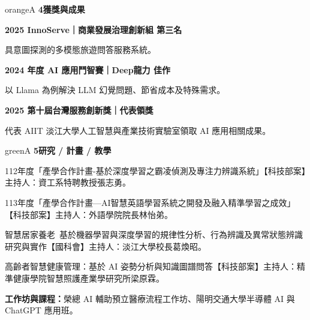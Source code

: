\documentclass[10pt,a4paper]{extarticle}
\newcommand{\hi}[1]{\textcolor{redA}{\textbf{#1}}}
\newcommand{\sect}[3]{%
  {\fontsize{13}{14}\selectfont\bfseries\textcolor{#2}{#1}\hspace{1mm}#3}\par\vspace{.45mm}
}
\begin{document}
\vspace{1mm}
\begin{minipage}[t]{96mm}
  \begin{colorboxx}[height=47mm]{orangeA}
    \sect{4}{orangeA}{獲獎與成果}
    {\small
    \textbf{2025 InnoServe｜商業發展治理創新組 \hi{第三名}}\par
    具意圖探測的多模態旅遊問答服務系統。\par\vspace{.7mm}
    \textbf{2024 年度 AI 應用鬥智賽｜Deep龍力 \hi{佳作}}\par
    以 Llama 為例解決 LLM 幻覺問題、節省成本及特殊需求。\par\vspace{.7mm}
    \textbf{2025 第十屆台灣服務創新獎｜\hi{代表領獎}}\par
    代表 AIIT 淡江大學人工智慧與產業技術實驗室領取 AI 應用相關成果。}
  \end{colorboxx}
\end{minipage}\hfill
\begin{minipage}[t]{98mm}
  \begin{colorboxx}[height=47mm]{greenA}
    \sect{5}{greenA}{研究 / 計畫 / 教學}
    {\footnotesize
    112年度「產學合作計畫-基於深度學習之霸凌偵測及專注力辨識系統」【科技部案】主持人：資工系特聘教授張志勇。\par
    113年度「產學合作計畫—AI智慧英語學習系統之開發及融入精準學習之成效」【科技部案】主持人：外語學院院長林怡弟。\par
    智慧居家養老~基於機器學習與深度學習的規律性分析、行為辨識及異常狀態辨識研究與實作【國科會】主持人：淡江大學校長葛煥昭。\par
    高齡者智慧健康管理：基於 AI 姿勢分析與知識圖譜問答【科技部案】主持人：精準健康學院智慧照護產業學研究所梁原霖。\par
    \textbf{工作坊與課程：}榮總 AI 輔助預立醫療流程工作坊、陽明交通大學半導體 AI 與 ChatGPT 應用班。}
  \end{colorboxx}
\end{minipage}
\end{document}
